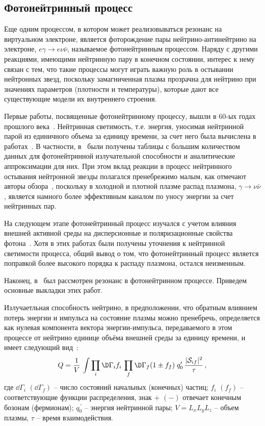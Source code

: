 \subsection{Фотонейтринный процесс}
Еще одним процессом, в котором может реализовываться резонанс на виртуальном электроне, является фоторождение пары нейтрино-антинейтрино на электроне, $e\gamma\to e\nu\bar\nu$, называемое фотонейтринным процессом. Наряду с другими реакциями, имеющими нейтринную пару в конечном состоянии, интерес к нему связан с тем, что такие процессы могут играть важную роль в остывании нейтронных звезд, поскольку замагниченная плазма прозрачна для нейтрино при значениях параметров (плотности и температуры), которые дают все существующие модели их внутреннего строения.

Первые работы, посвященные фотонейтринному процессу, вышли в 60-ых годах прошлого века~\cite{Ritus:1961,Chiu:1961}. Нейтринная светимость, т.е. энергия, уносимая нейтринной парой из единичного объема за единицу времени, за счет него была вычислена в работах~\cite{Beaudet:1967,Dicus:1972,Munakata:1985,Shindler:1987,Itoh:1989,Itoh:1996,Skobelev:2000}. В частности, в~\cite{Itoh:1989,Itoh:1996} были получены таблицы с большим количеством данных для фотонейтринной излучательной способности и аналитические аппроксимации для них. При этом вклад реакции в процесс нейтринного остывания нейтронной звезды полагался пренебрежимо малым, как отмечают авторы обзора~\cite{Yakovlev2001}, поскольку в холодной и плотной плазме распад плазмона, $\gamma\to\nu\bar\nu$, является намного более эффективным каналом по уносу энергии за счет нейтринных пар.

На следующем этапе фотонейтринный процесс изучался с учетом влияния внешней активной среды на дисперсионные и поляризационные свойства фотона~\cite{RCh:2008,Borisov:2012,RumChMik}. Хотя в этих работах были получены уточнения к нейтринной светимости процесса, общий вывод о том, что фотонейтринный процесс является поправкой более высокого порядка к распаду плазмона, остался неизменным.

Наконец, в~\cite{Chistyakov:2014cga,qfthep2017} был рассмотрен резонанс в фотонейтринном процессе. Приведем основные выкладки этих работ.

Излучаетльная способность нейтрино, в предположении, что обратным влиянием потерь энергии и импульса на состояние 
плазмы можно пренебречь, определяется как нулевая компонента вектора энергии-импульса, передаваемого в этом 
процессе от нейтрино единице объёма внешней среды за единицу времени, и имеет следующий вид~\cite{Yakovlev2000, Gvozdev:2002}:
%                                                   
\begin{eqnarray}
\label{lumin}
Q = \frac{1}{V}\, \int \prod \limits_{i} \D \Gamma_i f_i \,
\prod \limits_{f} \D \Gamma_f (1\pm f_f) \; q'_0\,
\frac{|{\cal S}_{if}|^2}{\tau}\, ,
\end{eqnarray}
\noindent где $\dd \Gamma_i$ $(\dd \Gamma_f)$ -- число состояний начальных 
(конечных) частиц; $f_i$ $(f_f)$ -- соответствующие функции распределения, 
знак  $+$ $(-)$ отвечает конечным бозонам (фермионам); 
$q^{\, \prime}_0$ -- энергия нейтринной пары; $V = L_x L_y L_z$ -- объем плазмы, $\tau$ -- время 
взаимодействия.

